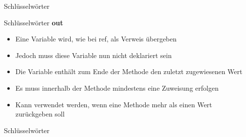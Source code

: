 \begin{frame}{Schlüsselwörter}
	
	
\end{frame}

\begin{frame}{Schlüsselwörter}
	\textbf{out}\\
	\begin{itemize}
		\item Eine Variable wird, wie bei \alert{ref}, als Verweis übergeben
		\item Jedoch muss diese Variable nun nicht deklariert sein
		\item Die Variable enthält zum Ende der Methode den zuletzt zugewiesenen Wert
		\item Es muss innerhalb der Methode mindestens eine Zuweisung erfolgen
		\item Kann verwendet werden, wenn eine Methode mehr als einen Wert zurückgeben soll
	\end{itemize}
\end{frame}

\begin{frame}{Schlüsselwörter}
	
	
\end{frame}


